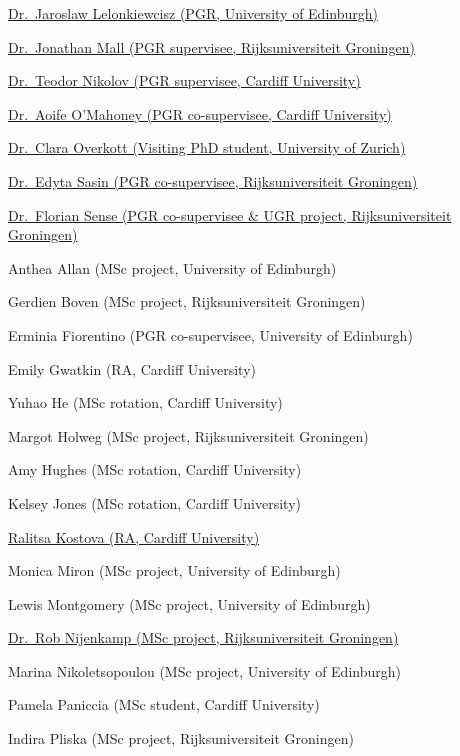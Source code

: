 \documentclass[
  12pt,
]{book}
\begin{document}
\href{https://www.researchgate.net/profile/Jaroslaw-Lelonkiewicz}{Dr.~Jaroslaw Lelonkiewcisz (PGR, University of Edinburgh)}

\href{https://www.linkedin.com/in/drjonathanmall/}{Dr.~Jonathan Mall (PGR supervisee, Rijksuniversiteit Groningen)}

\href{https://profiles.cardiff.ac.uk/staff/nikolovty}{Dr.~Teodor Nikolov (PGR supervisee, Cardiff University)}

\href{https://linkedin.com/in/aoife-o-mahony-913769a1}{Dr.~Aoife O'Mahoney (PGR co-supervisee, Cardiff University)}

\href{https://www.lernpraxis.ch/team/clara-overkott/}{Dr.~Clara Overkott (Visiting PhD student, University of Zurich)}

\href{https://nyuad.nyu.edu/en/research/faculty-labs-and-projects/fougnie-lab/edyta-sasin.html}{Dr.~Edyta Sasin (PGR co-supervisee, Rijksuniversiteit Groningen)}

\href{https://www.floriansense.com/}{Dr.~Florian Sense (PGR co-supervisee \& UGR project, Rijksuniversiteit Groningen)}

Anthea Allan (MSc project, University of Edinburgh)

Gerdien Boven (MSc project, Rijksuniversiteit Groningen)

Erminia Fiorentino (PGR co-supervisee, University of Edinburgh)

Emily Gwatkin (RA, Cardiff University)

Yuhao He (MSc rotation, Cardiff University)

Margot Holweg (MSc project, Rijksuniversiteit Groningen)

Amy Hughes (MSc rotation, Cardiff University)

Kelsey Jones (MSc rotation, Cardiff University)

\href{https://mphiliastides.org/en/team/ralitsa-kostova}{Ralitsa Kostova (RA, Cardiff University)}

Monica Miron (MSc project, University of Edinburgh)

Lewis Montgomery (MSc project, University of Edinburgh)

\href{https://www.rug.nl/staff/r.nijenkamp/}{Dr.~Rob Nijenkamp (MSc project, Rijksuniversiteit Groningen)}

Marina Nikoletsopoulou (MSc project, University of Edinburgh)

Pamela Paniccia (MSc student, Cardiff University)

Indira Pliska (MSc project, Rijksuniversiteit Groningen)
\end{document}
